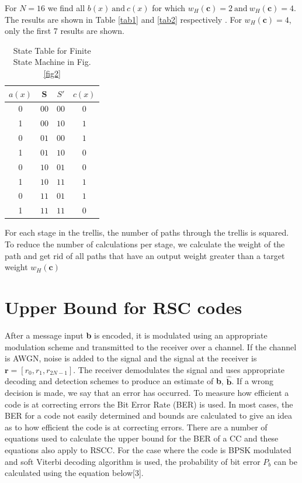 \documentclass[twocolumn]{article}
\begin{document}
 For $N=16$ we find all $b(x) ~\text{and}~ c(x)$ for which $w_H(\textbf{c})=2 ~\text{and} ~ w_H(\textbf{c})=4$. The results are shown in Table \ref{tab1} and \ref{tab2} respectively . For $w_H(\textbf{c})=4$, only the first 7 results are shown.  
 
   \begin{table}[h!]
 
 \caption{State Table for Finite State Machine in Fig. \ref{fig2}}
\centering
 \begin{tabular}{c c c c} 
 \hline
 $a(x)$ & S & $S'$ & $c(x)$ \\ [0.5ex] 
 \hline\hline
 0 & $0 0 $& $0 0$ & $0$\\ 
  1& $0 0$ & $1 0$ & $1$ \\
  0 & $0 1$& $0 0$ & $1$ \\
  1& $0 1$& $1 0$& $0$ \\
  0& $1 0$ & $0 1$ & $0$ \\
 1 & $1 0 $ & $1 1$ & $1$\\ 
 0 & $1 1$ & $0 1$ & $1$ \\ 
 1 & $1 1$ & $1 1$ & $0$ \\ [1ex] 
 \hline
 \end{tabular}
 \label{tab3}
\end{table}
 
  For each stage in the trellis, the number of paths through the trellis is squared. To reduce the number of calculations per stage, we calculate the weight of the path and get rid of all paths that have an output weight greater than a target weight $w_H(\textbf{c})$
 
\section{Upper Bound for RSC codes}
\label{sec4}
After a message input \textbf{b} is encoded, it is modulated using an appropriate modulation scheme and transmitted to the receiver over a channel. If the channel is AWGN, noise is added to the signal and the signal at the receiver is $\textbf{r}=[r_0,r_1,r_{2N-1}]$. The receiver demodulates the signal and uses appropriate decoding and detection schemes to produce an estimate of \textbf{b}, $\hat{ \textbf{b} }$. If a wrong decision is made, we say that an error has occurred. To measure how efficient a code is at correcting errors the Bit Error Rate (BER) is used. In most cases, the BER for a code not easily determined and bounds are calculated to give an idea as to how efficient the code is at correcting errors. There are a number of equations used to calculate the upper bound for the BER of a CC and these equations also apply to RSCC. For the case where the code is BPSK modulated and soft Viterbi decoding algorithm is used, the probability of bit error $P_b$ can be calculated using the equation below[3].
\end{document}
